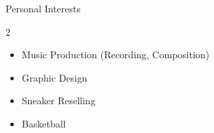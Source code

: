 \documentclass[]{johnsoncv}
\begin{document}
	\begin{cvsection}{Personal Interests}
		\begin{cvsubsection}{}{}{}	
			\begin{multicols} {2}
			\begin{itemize}
			\setlength\columnsep{4pt}
				\item Music Production (Recording, Composition)
								\item Graphic Design

				\item Sneaker Reselling
				\item Basketball

			\end{itemize}
			\end{multicols}
		\end{cvsubsection}
	\end{cvsection}
	
	
	
\end{document}
